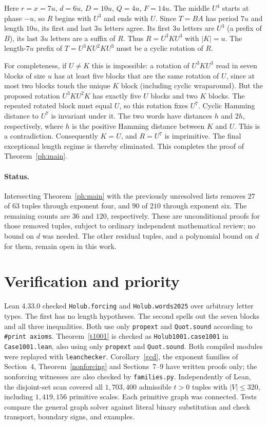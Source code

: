 \documentclass[11pt]{article}
\theoremstyle{remark}\newtheorem*{remark}{Remark}
\begin{document}
Here $r=x=7u$, $d=6u$, $D=10u$, $Q=4u$, $F=14u$.
The middle $U^4$ starts at phase $-u$, so $R$ begins with $U^3$
and ends with $U$. Since $T=BA$ has period $7u$ and length $10u$,
its first and last $3u$ letters agree. Its first $3u$ letters are
$U^3$ (a prefix of $B$), its last $3u$ letters are a suffix of $R$.
Thus $R=U^3 K U^3$ with $|K|=u$. The length-$7u$ prefix of
$T=U^3 K U^2 K U^3$ must be a cyclic rotation of $R$.

For completeness, if $U\ne K$ this is impossible: a rotation of
$U^3 K U^3$ read in seven blocks of size $u$ has at least five blocks
that are the same rotation of $U$, since at most two blocks touch
the unique $K$ block (including cyclic wraparound). But the proposed
rotation $U^3 K U^2 K$ has exactly five $U$ blocks and two $K$
blocks. The repeated rotated block must equal $U$, so this rotation
fixes $U^7$. Cyclic Hamming distance to $U^7$ is invariant under it.
The two words have distances $h$ and $2h$, respectively, where
$h$ is the positive Hamming distance between $K$ and $U$. This is a
contradiction. Consequently $K=U$, and $R=U^7$ is imprimitive.
The final exceptional length regime is thereby eliminated. This
completes the proof of Theorem~\ref{ph:main}.

\paragraph{Status.}
Intersecting Theorem~\ref{ph:main} with the previously unresolved
lists removes $27$ of $63$ tuples through exponent four, and $90$
of $210$ through exponent six. The remaining counts are $36$ and
$120$, respectively. These are unconditional proofs for those removed
tuples, subject to ordinary independent mathematical review; no bound
on $d$ was needed. The other residual tuples, and a polynomial bound
on $d$ for them, remain open in this work.

\section{Verification and priority}
Lean 4.33.0 checked \texttt{Holub.forcing} and \texttt{Holub.words2025} over arbitrary letter types. The first has no length hypotheses. The second spells out the seven blocks and all three inequalities. Both use only \texttt{propext} and \texttt{Quot.sound} according to \texttt{\#print axioms}. Theorem~\ref{t1001} is checked as \texttt{Holub1001.case1001} in \texttt{Case1001.lean}, also using only \texttt{propext} and \texttt{Quot.sound}. Both compiled modules were replayed with \texttt{leanchecker}. Corollary~\ref{gcd}, the exponent families of Section~4, Theorem~\ref{nonforcing} and Sections~7--9 have written proofs only; the nonforcing witnesses are also checked by \texttt{families.py}. Independently of Lean, the disjoint-set scan covered all \(1{,}703{,}400\) admissible \(t>0\) tuples with \(|V|\le320\), including \(1{,}419{,}156\) primitive scales. Each primitive graph was connected. Tests compare the general graph solver against literal binary substitution and check transport, boundary signs, and examples.
\end{document}
